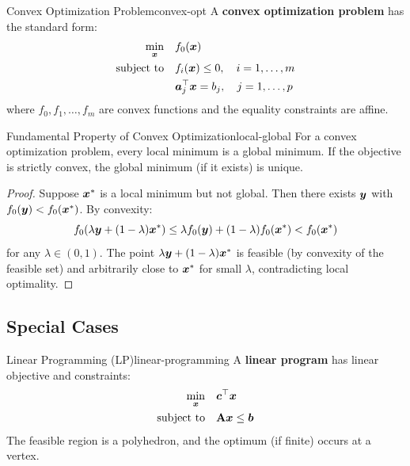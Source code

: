 \documentclass[../../main.tex]{subfiles}
\begin{document}
\begin{definition}{Convex Optimization Problem}{convex-opt}
A \textbf{convex optimization problem} has the standard form:
\begin{align*}
    \min_{\boldsymbol{x}} \quad & f_0(\boldsymbol{x}) \\
    \text{subject to} \quad & f_i(\boldsymbol{x}) \leq 0, \quad i = 1, \ldots, m \\
    & \boldsymbol{a}_j^\top \boldsymbol{x} = b_j, \quad j = 1, \ldots, p
\end{align*}
where $f_0, f_1, \ldots, f_m$ are convex functions and the equality constraints are affine.
\end{definition}

\begin{theorem}{Fundamental Property of Convex Optimization}{local-global}
For a convex optimization problem, every local minimum is a global minimum. If the objective is strictly convex, the global minimum (if it exists) is unique.
\end{theorem}

\begin{proof}
Suppose $\boldsymbol{x}^*$ is a local minimum but not global. Then there exists $\boldsymbol{y}$ with $f_0(\boldsymbol{y}) < f_0(\boldsymbol{x}^*)$. By convexity:
\[
    f_0(\lambda \boldsymbol{y} + (1-\lambda)\boldsymbol{x}^*) \leq \lambda f_0(\boldsymbol{y}) + (1-\lambda)f_0(\boldsymbol{x}^*) < f_0(\boldsymbol{x}^*)
\]
for any $\lambda \in (0,1)$. The point $\lambda \boldsymbol{y} + (1-\lambda)\boldsymbol{x}^*$ is feasible (by convexity of the feasible set) and arbitrarily close to $\boldsymbol{x}^*$ for small $\lambda$, contradicting local optimality.
\end{proof}

\subsection{Special Cases}

\begin{definition}{Linear Programming (LP)}{linear-programming}
A \textbf{linear program} has linear objective and constraints:
\begin{align*}
    \min_{\boldsymbol{x}} \quad & \boldsymbol{c}^\top \boldsymbol{x} \\
    \text{subject to} \quad & \mathbf{A}\boldsymbol{x} \leq \boldsymbol{b}
\end{align*}
The feasible region is a polyhedron, and the optimum (if finite) occurs at a vertex.
\end{definition}
\end{document}
